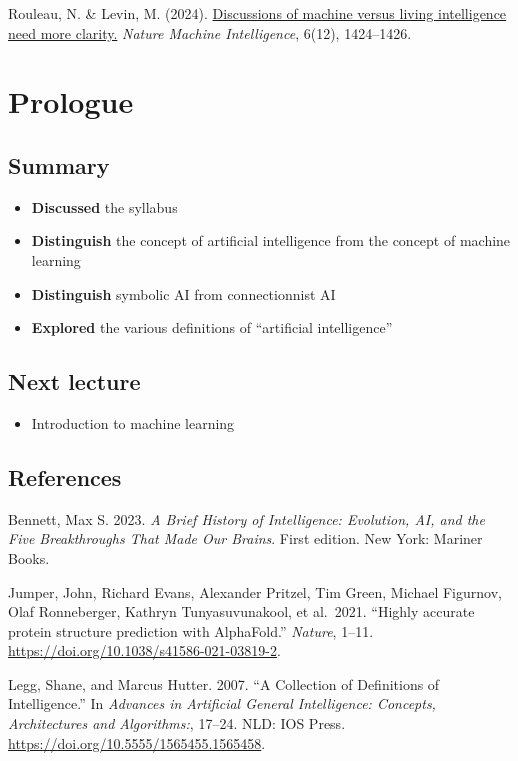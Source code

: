 \documentclass[
  letterpaper,
  DIV=11,
  numbers=noendperiod]{scrartcl}
\providecommand{\tightlist}{%
  \setlength{\itemsep}{0pt}\setlength{\parskip}{0pt}}
\begin{document}
Rouleau, N. \& Levin, M. (2024).
\href{(https://doi.org/10.1038/s42256-024-00955-y)}{Discussions of
machine versus living intelligence need more clarity.} \emph{Nature
Machine Intelligence}, 6(12), 1424--1426.

\section{Prologue}\label{prologue}

\subsection{Summary}\label{summary}

\begin{itemize}
\tightlist
\item
  \textbf{Discussed} the syllabus
\item
  \textbf{Distinguish} the concept of artificial intelligence from the
  concept of machine learning
\item
  \textbf{Distinguish} symbolic AI from connectionnist AI
\item
  \textbf{Explored} the various definitions of ``artificial
  intelligence''
\end{itemize}

\subsection{Next lecture}\label{next-lecture}

\begin{itemize}
\tightlist
\item
  Introduction to machine learning
\end{itemize}

\subsection{References}\label{references}

Bennett, Max S. 2023. \emph{A Brief History of Intelligence: Evolution,
AI, and the Five Breakthroughs That Made Our Brains}. First edition. New
York: Mariner Books.

Jumper, John, Richard Evans, Alexander Pritzel, Tim Green, Michael
Figurnov, Olaf Ronneberger, Kathryn Tunyasuvunakool, et al.~2021.
``{Highly accurate protein structure prediction with AlphaFold}.''
\emph{Nature}, 1--11. \url{https://doi.org/10.1038/s41586-021-03819-2}.

Legg, Shane, and Marcus Hutter. 2007. ``{A Collection of Definitions of
Intelligence}.'' In \emph{Advances in Artificial General Intelligence:
Concepts, Architectures and Algorithms:}, 17--24. NLD: IOS Press.
\url{https://doi.org/10.5555/1565455.1565458}.
\end{document}

